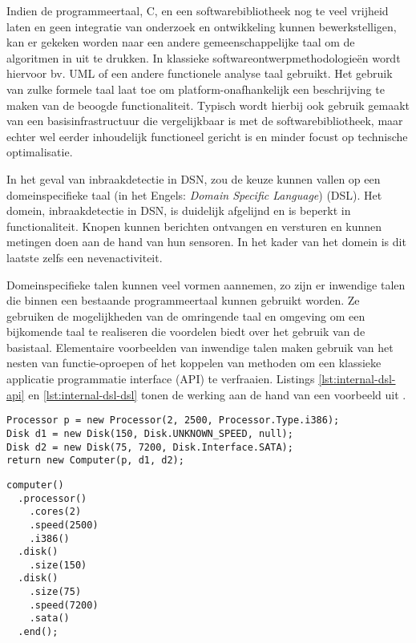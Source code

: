 Indien de programmeertaal, C, en een softwarebibliotheek nog te veel vrijheid
laten en geen integratie van onderzoek en ontwikkeling kunnen bewerkstelligen,
kan er gekeken worden naar een andere gemeenschappelijke taal om de algoritmen
in uit te drukken. In klassieke softwareontwerpmethodologie\"en wordt hiervoor
bv. UML \citep{url:uml} of een andere functionele analyse taal gebruikt. Het
gebruik van zulke formele taal laat toe om platform-onafhankelijk een
beschrijving te maken van de beoogde functionaliteit. Typisch wordt hierbij ook
gebruik gemaakt van een basisinfrastructuur die vergelijkbaar is met de
softwarebibliotheek, maar echter wel eerder inhoudelijk functioneel gericht is
en minder focust op technische optimalisatie.

In het geval van inbraakdetectie in DSN, zou de keuze kunnen vallen op een
domeinspecifieke taal (in het Engels: \emph{Domain Specific Language})
(DSL)\citep{van2000domain, mernik2005and, fowler2010domain}. Het domein,
inbraakdetectie in DSN, is duidelijk afgelijnd en is beperkt in
functionaliteit. Knopen kunnen berichten ontvangen en versturen en kunnen
metingen doen aan de hand van hun sensoren. In het kader van het domein is dit
laatste zelfs een nevenactiviteit.

Domeinspecifieke talen kunnen veel vormen aannemen, zo zijn er inwendige talen
die binnen een bestaande programmeertaal kunnen gebruikt worden. Ze gebruiken
de mogelijkheden van de omringende taal en omgeving om een bijkomende taal te
realiseren die voordelen biedt over het gebruik van de basistaal. Elementaire
voorbeelden van inwendige talen maken gebruik van het nesten van
functie-oproepen of het koppelen van methoden om een klassieke applicatie
programmatie interface (API) te verfraaien. Listings \ref{lst:internal-dsl-api}
en \ref{lst:internal-dsl-dsl} tonen de werking aan de hand van een voorbeeld
uit \citep{fowler2010domain}.

\begin{verbatim}
Processor p = new Processor(2, 2500, Processor.Type.i386);
Disk d1 = new Disk(150, Disk.UNKNOWN_SPEED, null);
Disk d2 = new Disk(75, 7200, Disk.Interface.SATA);
return new Computer(p, d1, d2);
\end{verbatim}
\label{lst:internal-dsl-api}

\begin{verbatim}
computer()
  .processor()
    .cores(2)
    .speed(2500)
    .i386()
  .disk()
    .size(150)
  .disk()
    .size(75)
    .speed(7200)
    .sata()
  .end();
\end{verbatim}
\label{lst:internal-dsl-dsl}

